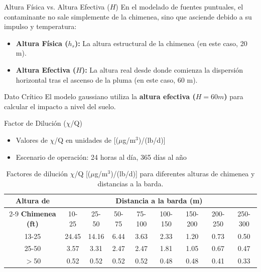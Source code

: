 \documentclass[10pt,compress]{beamer}
\begin{document}
\begin{frame}{Altura Física vs. Altura Efectiva ($H$)}
    En el modelado de fuentes puntuales, el contaminante no sale simplemente de la chimenea, sino que asciende debido a su impulso y temperatura:
    \begin{itemize}
        \item \textbf{Altura Física ($h_s$):} La altura estructural de la chimenea (en este caso, 20 m).
        \item \textbf{Altura Efectiva ($H$):} La altura real desde donde comienza la dispersión horizontal tras el ascenso de la pluma (en este caso, 60 m).
    \end{itemize}
    \begin{exampleblock}{Dato Crítico}
        El modelo gaussiano utiliza la \textbf{altura efectiva ($H=60m$)} para calcular el impacto a nivel del suelo.
    \end{exampleblock}
\end{frame}
\begin{frame}{Factor de Dilución ($\chi$/Q)}
\begin{itemize}
\item Valores de $\chi$/Q en unidades de [($\mu$g/m$^3$)/(lb/d)]
\item Escenario de operación: 24 horas al día, 365 días al año
\end{itemize}
\vspace{0.3cm}
\begin{table}[h]
\centering
\small
\setlength{\tabcolsep}{3pt}
\begin{tabular}{c|cccccccc}
\toprule
\multirow{2}{*}{\textbf{Altura de}} & \multicolumn{8}{c}{\textbf{Distancia a la barda (m)}} \\
\cline{2-9}
\textbf{Chimenea (ft)} & 10-25 & 25-50 & 50-75 & 75-100 & 100-150 & 150-200 & 200-250 & 250-300 \\
\midrule
13-25 & 24.45 & 14.16 & 6.44 & 3.63 & 2.33 & 1.20 & 0.73 & 0.50 \\
25-50 & 3.57 & 3.31 & 2.47 & 2.47 & 1.81 & 1.05 & 0.67 & 0.47 \\
$>$50 & 0.52 & 0.52 & 0.52 & 0.52 & 0.48 & 0.48 & 0.41 & 0.33 \\
\bottomrule
\end{tabular}
\caption{Factores de dilución $\chi$/Q [($\mu$g/m$^3$)/(lb/d)] para diferentes alturas de chimenea y distancias a la barda.}
\label{tab:dilucion}
\end{table}
\end{frame}
\end{document}
